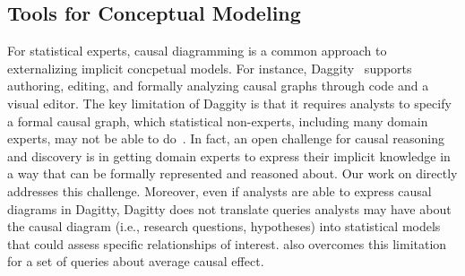 
\subsection{Tools for Conceptual Modeling}
For statistical experts, causal diagramming is a common approach to
externalizing implicit concpetual models. For instance,
Daggity~\cite{textor2011dagitty} supports authoring, editing, and formally
analyzing causal graphs through code and a visual editor. The key limitation of
Daggity is that it requires analysts to specify a formal causal graph, which
statistical non-experts, including many domain experts, may not be able to
do~\cite{suzuki2020causal,suzuki2018mechanisms,velentgas2013developing}. In
fact, an open challenge for causal reasoning and discovery is in getting domain
experts to express their implicit knowledge in a way that can be formally
represented and reasoned about. Our work on \tisane directly addresses this
challenge. Moreover, even if analysts are able to express causal diagrams in
Dagitty, Dagitty does not translate queries analysts may have about the causal
diagram (i.e., research questions, hypotheses) into statistical models that
could assess specific relationships of interest. \tisane also overcomes this
limitation for a set of queries about average causal effect. 


\def\edibble{\texttt{edibble}\xspace}
